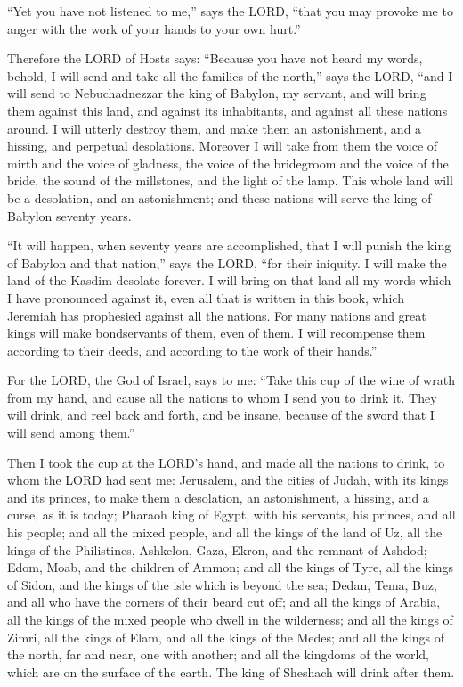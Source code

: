 \myverse{}“Yet you have not listened to me,” says the LORD, “that you may provoke me to anger with the work of your hands to your own hurt.”


\myverse{}Therefore the LORD of Hosts says: “Because you have not heard my words, \myverse{}behold, I will send and take all the families of the north,” says the LORD, “and I will send to Nebuchadnezzar the king of Babylon, my servant, and will bring them against this land, and against its inhabitants, and against all these nations around. I will utterly destroy them, and make them an astonishment, and a hissing, and perpetual desolations. \myverse{}Moreover I will take from them the voice of mirth and the voice of gladness, the voice of the bridegroom and the voice of the bride, the sound of the millstones, and the light of the lamp. \myverse{}This whole land will be a desolation, and an astonishment; and these nations will serve the king of Babylon seventy years.


\myverse{}“It will happen, when seventy years are accomplished, that I will punish the king of Babylon and that nation,” says the LORD, “for their iniquity. I will make the land of the Kasdim desolate forever. \myverse{}I will bring on that land all my words which I have pronounced against it, even all that is written in this book, which Jeremiah has prophesied against all the nations. \myverse{}For many nations and great kings will make bondservants of them, even of them. I will recompense them according to their deeds, and according to the work of their hands.”


\myverse{}For the LORD, the God of Israel, says to me: “Take this cup of the wine of wrath from my hand, and cause all the nations to whom I send you to drink it. \myverse{}They will drink, and reel back and forth, and be insane, because of the sword that I will send among them.”


\myverse{}Then I took the cup at the LORD’s hand, and made all the nations
to drink, to whom the LORD had sent me: \myverse{}Jerusalem, and the cities of Judah, with its kings and its princes, to make them a desolation, an astonishment, a hissing, and a curse, as it is today; \myverse{}Pharaoh king of Egypt, with his servants, his princes, and all his people; \myverse{}and all the mixed people, and all the kings of the land of Uz, all the kings of the Philistines, Ashkelon, Gaza, Ekron, and the remnant of Ashdod; \myverse{}Edom, Moab, and the children of Ammon; \myverse{}and all the kings of Tyre, all the kings of Sidon, and the kings of the isle which is beyond the sea; \myverse{}Dedan, Tema, Buz, and all who have the corners of their beard cut off; \myverse{}and all the kings of Arabia, all the kings of the mixed people who dwell in the wilderness; \myverse{}and all the kings of Zimri, all the kings of Elam, and all the kings of the Medes; \myverse{}and all the kings of the north, far and near, one with another; and all the kingdoms of the world, which are on the surface of the earth. The king of Sheshach will drink after them.


